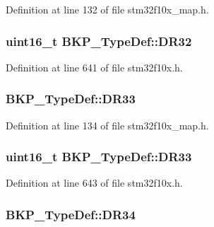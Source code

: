 Definition at line 132 of file stm32f10x\+\_\+map.\+h.

\subsubsection[{\texorpdfstring{D\+R32}{DR32}}]{ {\bf uint16\+\_\+t} B\+K\+P\+\_\+\+Type\+Def\+::\+D\+R32}\hypertarget{struct_b_k_p___type_def_af55d82fdc7570503f812dc3ba895ed61}{}\label{struct_b_k_p___type_def_af55d82fdc7570503f812dc3ba895ed61}


Definition at line 641 of file stm32f10x.\+h.

\subsubsection[{\texorpdfstring{D\+R33}{DR33}}]{ B\+K\+P\+\_\+\+Type\+Def\+::\+D\+R33}\hypertarget{struct_b_k_p___type_def_ac232dc747dbdded6346e594401ca8dfe}{}\label{struct_b_k_p___type_def_ac232dc747dbdded6346e594401ca8dfe}


Definition at line 134 of file stm32f10x\+\_\+map.\+h.

\subsubsection[{\texorpdfstring{D\+R33}{DR33}}]{ {\bf uint16\+\_\+t} B\+K\+P\+\_\+\+Type\+Def\+::\+D\+R33}\hypertarget{struct_b_k_p___type_def_a8f15e1d81071ebe109d6558acd8f3d9a}{}\label{struct_b_k_p___type_def_a8f15e1d81071ebe109d6558acd8f3d9a}


Definition at line 643 of file stm32f10x.\+h.

\subsubsection[{\texorpdfstring{D\+R34}{DR34}}]{ B\+K\+P\+\_\+\+Type\+Def\+::\+D\+R34}\hypertarget{struct_b_k_p___type_def_aa0fadd24e52586d27ca030ac6da4cb26}{}\label{struct_b_k_p___type_def_aa0fadd24e52586d27ca030ac6da4cb26}


